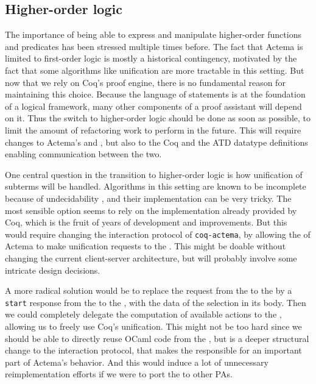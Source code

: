 \subsection{Higher-order logic}

The importance of being able to express and manipulate higher-order functions
and predicates has been stressed multiple times before. The fact that Actema is
limited to first-order logic is mostly a historical contingency, motivated by
the fact that some algorithms like unification are more tractable in this
setting. But now that we rely on Coq's proof engine, there is no fundamental
reason for maintaining this choice. Because the language of statements is at the
foundation of a logical framework, many other components of a proof assistant
will depend on it. Thus the switch to higher-order logic should be done as soon
as possible, to limit the amount of refactoring work to perform in the future.
This will require changes to Actema's  and ,
but also to the Coq  and the ATD datatype definitions enabling
communication between the two.

One central question in the transition to higher-order logic is how unification
of subterms will be handled. Algorithms in this setting are known to be
incomplete because of undecidability , and
their implementation can be very tricky. The most sensible option seems to rely
on the implementation already provided by Coq, which is the fruit of years of
development and improvements. But this would require changing the interaction
protocol of \texttt{coq-actema}, by allowing the  of Actema to
make unification requests to the . This might be doable without
changing the current client-server architecture, but will probably involve some
intricate design decisions.

A more radical solution would be to replace the  request from
the  to the  by a \texttt{start} response
from the  to the , with the data of the
selection in its body. Then we could completely delegate the computation of
available actions to the , allowing us to freely use Coq's
unification. This might not be too hard since we should be able to directly
reuse OCaml code from the , but is a deeper structural change
to the interaction protocol, that makes the  responsible for an
important part of Actema's behavior. And this would induce a lot of unnecessary
reimplementation efforts if we were to port the  to other PAs.

